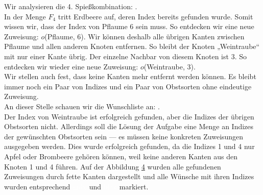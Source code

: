 Wir analysieren die 4. Spießkombination:
.\\
In der Menge $F_4$ tritt Erdbeere auf, deren Index bereits gefunden wurde.
Somit wissen wir, dass der Index von Pflaume 6 sein muss. 
So entdecken wir eine neue Zuweisung: $o$(Pflaume, 6).
Wir können deshalb alle übrigen Kanten zwischen Pflaume und allen anderen Knoten entfernen.
So bleibt der Knoten „Weintraube“ mit nur einer Kante übrig.
Der einzelne Nachbar von diesem Knoten ist 3. So entdecken wir wieder eine neue Zuweisung: $o$(Weintraube, 3).\\
Wir stellen auch fest, dass keine Kanten mehr entfernt werden können.
Es bleibt immer noch ein Paar von Indizes und ein Paar von Obstsorten ohne eindeutige Zuweisung.\\

An dieser Stelle schauen wir die Wunschliste an: .\\
Der Index von Weintraube ist erfolgreich gefunden, aber die Indizes der übrigen Obstsorten nicht.
Allerdings soll die Lösung der Aufgabe eine Menge an Indizes der gewünschten Obstsorten sein ---
es müssen keine konkreten Zuweisungen ausgegeben werden. 
Dies wurde erfolgreich gefunden, da die Indizes 1 und 4 nur Apfel oder Brombeere gehören können, weil
keine anderen Kanten aus den Knoten 1 und 4 führen.
Auf der Abbildung \ref{fig:example0-4} wurden alle gefundenen Zuweisungen durch fette Kanten dargestellt
und alle Wünsche mit ihren Indizes wurden entsprechend \colorbox{black!30!green}{\textcolor{white}{grün}} und \colorbox{black!5!blue}{\textcolor{white}{blau}} markiert.

\begin{figure}[H]
\centering
\begin{adjustbox}{minipage=\linewidth,scale=0.85}
\begin{subfigure}[t]{.24\textwidth}
\centering

\caption{}
\label{fig:example0-1}
\end{subfigure}\hfill
\begin{subfigure}[t]{.24\textwidth}
\centering

\caption{}
\label{fig:example0-2}
\end{subfigure}
\begin{subfigure}[t]{.24\textwidth}
\centering

\caption{}
\label{fig:example0-3}
\end{subfigure}\hfill
\begin{subfigure}[t]{.24\textwidth}
\centering

\caption{}
\label{fig:example0-4}
\end{subfigure}
\end{adjustbox}
\caption{}
\label{fig:example0}
\end{figure}


